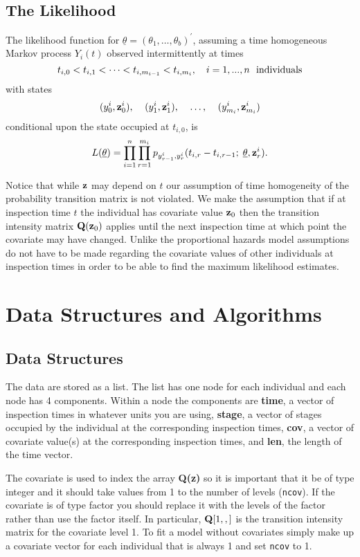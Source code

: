 \documentclass[12pt]{article}
\begin{document}
\subsection{The Likelihood}
The likelihood function for 
$\underline{\theta} = (\theta_{1}, \ldots, \theta_{b})^\prime$,
assuming a time homogeneous Markov process $Y_{i}(t)$ observed 
intermittently at times
\[ t_{i,0} < t_{i,1} < \cdots < t_{i,m_{i-1}} < t_{i,m_{i}} ,~~~
i=1,...,n ~~ {\rm individuals}\]
with states
\[ (y^{i}_{0},{\bf z}^i_0), \; \;  \; \;  (y^{i}_{1},{\bf z}^i_1) , 
\; \; \; \;  \ldots , \; \; \; \;  (y^{i}_{m_{i}},{\bf z}^i_{m_i})\]
conditional upon the state occupied at $t_{i,0}$, is
\[
   L(\underline{\theta}) =  \prod^{n}_{i=1} \prod^{m_{i}}_{r=1} p_{y^{i}_{r-1}, y^{i}_{r}}
  (t_{i,r}-t_{i,r-1}; \;
   \underline{\theta}, {\bf z}^i_r).   \label{eq: like}
\]

Notice that while ${\bf z}$ may depend on $t$ our
assumption of time homogeneity of the probability transition matrix is not violated.
We make the assumption that if at inspection time $t$ the
individual has covariate value ${\bf z}_0$ then the transition intensity
matrix ${\bf Q}({\bf z}_0)$ applies until the next inspection time
at which point the covariate may have changed.
Unlike the proportional hazards model assumptions do not have to be made
regarding the covariate values of other individuals at inspection times
in order to be able to find the maximum likelihood estimates.


\section{Data Structures and Algorithms}

\subsection{Data Structures}

The data are stored as a list. The list has one node for each individual and
each node has 4 components. 
Within a node the components are {\bf time}, a vector of inspection times
in whatever units you are using, {\bf stage}, a vector of stages occupied by the
individual at the corresponding inspection times, {\bf cov}, a vector of
covariate value(s) at the corresponding inspection times, 
and {\bf len}, the length of the time vector.

The covariate is used to index the array {\bf Q(z)} so it is important
that it be of type integer and it should take values from 1 to the number
of levels (\verb+ncov+).
If the covariate is of type factor you should replace it with the levels of
the factor rather than use the factor itself. 
In particular, ${\bf Q}[1,,]$ is the transition intensity matrix for the
covariate level 1.
To fit a model without covariates simply make up a covariate vector for
each individual that is always 1 and set \verb+ncov+ to 1. 
\end{document}
